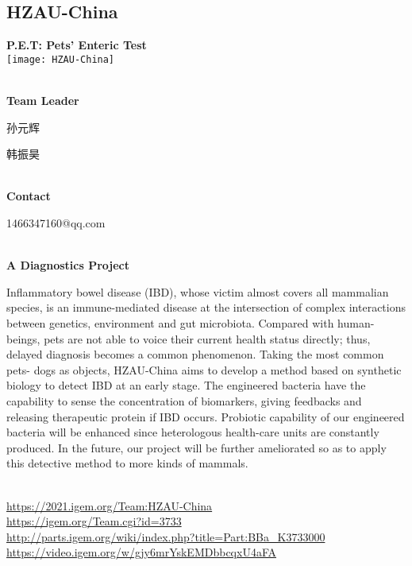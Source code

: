\subsection{\textcolor{Blu}{ HZAU-China } }
\vspace{5mm}
\begin{center}
\large{
  \textbf{ P.E.T: Pets’ Enteric Test }\\
  \texttt{[image: HZAU-China]}
}
\end{center}
\textbf{\\Team Leader}

  孙元辉

  韩振昊


\textbf{\\Contact}

  1466347160@qq.com


\textbf{\\A Diagnostics Project\\}\begin{spacing}{1.5}

Inflammatory bowel disease (IBD), whose victim almost covers all mammalian species, is an immune-mediated disease at the intersection of complex interactions between genetics, environment and gut microbiota. Compared with human-beings, pets are not able to voice their current health status directly; thus, delayed diagnosis becomes a common phenomenon. Taking the most common pets- dogs as objects, HZAU-China aims to develop a method based on synthetic biology to detect IBD at an early stage. The engineered bacteria have the capability to sense the concentration of biomarkers, giving feedbacks and releasing therapeutic protein if IBD occurs. Probiotic capability of our engineered bacteria will be enhanced since heterologous health-care units are constantly produced. In the future, our project will be further ameliorated so as to apply this detective method to more kinds of mammals.\end{spacing}
\\

\url{https://2021.igem.org/Team:HZAU-China }\\
\url{https://igem.org/Team.cgi?id=3733 }\\
\url{http://parts.igem.org/wiki/index.php?title=Part:BBa_K3733000 }\\
\url{https://video.igem.org/w/gjy6mrYskEMDbbcqxU4aFA }\\

\vfill{}









